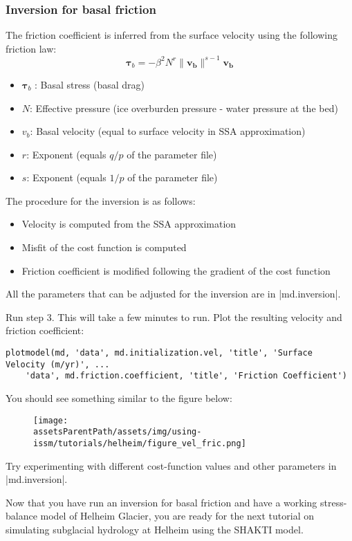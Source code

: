 \subsubsection{Inversion for basal friction}%
The friction coefficient is inferred from the surface velocity using the following friction law:
\begin{equation}
	\mathbf{ \tau }_b = -\beta^{2} N^r \|\mathbf{v_b}\|^{s-1}\mathbf{v_b}
\end{equation}

\begin{itemize}
	\item $\mathbf{ \tau }_b$ : Basal stress (basal drag)
	\item $N$: Effective pressure (ice overburden pressure - water pressure at the bed)
	\item $v_b$: Basal velocity (equal to surface velocity in SSA approximation)
	\item $r$: Exponent (equals $q/p$ of the parameter file)
	\item $s$: Exponent (equals $1/p$ of the parameter file)
\end{itemize}

The procedure for the inversion is as follows:
\begin{itemize}
	\item Velocity is computed from the SSA approximation
	\item Misfit of the cost function is computed
	\item Friction coefficient is modified following the gradient of the cost function
\end{itemize}

All the parameters that can be adjusted for the inversion are in \lstinlinebg|md.inversion|.

Run step 3. This will take a few minutes to run. Plot the resulting velocity and friction coefficient:

\begin{lstlisting}
plotmodel(md, 'data', md.initialization.vel, 'title', 'Surface Velocity (m/yr)', ...
	'data', md.friction.coefficient, 'title', 'Friction Coefficient')
\end{lstlisting}
You should see something similar to the figure below:
\begin{figure}[h!]
	\begin{center}
		\texttt{[image: \\assetsParentPath/assets/img/using-issm/tutorials/helheim/figure\_vel\_fric.png]}
	\end{center}
\end{figure}

Try experimenting with different cost-function values and other parameters in \lstinlinebg|md.inversion|.

Now that you have run an inversion for basal friction and have a working stress-balance model of Helheim Glacier, you are ready for the next tutorial on simulating subglacial hydrology at Helheim using the SHAKTI model.

\clearpage %
